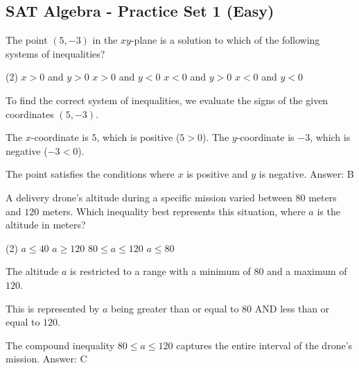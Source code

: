 \documentclass[11pt,paper=a4,answers]{exam}
\begin{document}
\begin{questions}
\pointsinrightmargin
\pointsdroppedatright
\marksnotpoints
{}
\pointformat{\boldmath\themarginpoints}
\bracketedpoints


\section*{SAT Algebra - Practice Set 1 (Easy)}

\question
The point $(5, -3)$ in the $xy$-plane is a solution to which of the following systems of inequalities?
\begin{tasks}(2)
\task $x > 0$ and $y > 0$
\task $x > 0$ and $y < 0$
\task $x < 0$ and $y > 0$
\task $x < 0$ and $y < 0$
\end{tasks}

\begin{solution}
To find the correct system of inequalities, we evaluate the signs of the given coordinates $(5, -3)$.
\vspace{5pt}
\begin{center}
The $x$-coordinate is $5$, which is positive ($5 > 0$).
\vspace{5pt}
The $y$-coordinate is $-3$, which is negative ($-3 < 0$).
\end{center}
\vspace{5pt}
The point satisfies the conditions where $x$ is positive and $y$ is negative.
\vspace{5pt}
Answer: \colorbox{yellow!100}{B}
\end{solution}

\vspace{1cm}

\question
A delivery drone's altitude during a specific mission varied between $80$ meters and $120$ meters. Which inequality best represents this situation, where $a$ is the altitude in meters?
\begin{tasks}(2)
\task $a \leq 40$
\task $a \geq 120$
\task $80 \leq a \leq 120$
\task $a \leq 80$
\end{tasks}

\begin{solution}
The altitude $a$ is restricted to a range with a minimum of $80$ and a maximum of $120$.
\vspace{5pt}
\begin{center}
This is represented by $a$ being greater than or equal to $80$ AND less than or equal to $120$.
\end{center}
\vspace{5pt}
The compound inequality $80 \leq a \leq 120$ captures the entire interval of the drone's mission.
\vspace{5pt}
Answer: \colorbox{yellow!100}{C}
\end{solution}


\end{questions}
\end{document}
